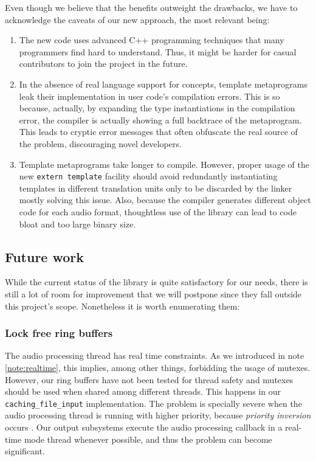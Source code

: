 Even though we believe that the benefits outweight the drawbacks, we
have to acknowledge the caveats of our new approach, the most relevant
being:
\begin{enumerate}
\item The new code uses advanced C++ programming techniques that many
  programmers find hard to understand. Thus, it might be harder for
  casual contributors to join the project in the future.

\item In the absence of real language support for concepts, template
  metaprograms leak their implementation in user code's compilation
  errors. This is so because, actually, by expanding the type
  instantiations in the compilation error, the compiler is actually
  showing a full backtrace of the metaprogram. This leads to cryptic
  error messages that often obfuscate the real source of the problem,
  discouraging novel developers.

\item Template metaprograms take longer to compile. However, proper
  usage of the new \texttt{extern template} facility should avoid
  redundantly instantiating templates in different translation units
  only to be discarded by the linker mostly solving this issue. Also,
  because the compiler generates different object code for each audio
  format, thoughtless use of the library can lead to code bloat and
  too large binary size.
\end{enumerate}

\subsection{Future work}

While the current status of the library is quite satisfactory for our
needs, there is still a lot of room for improvement that we will
postpone since they fall outside this project's scope. Nonetheless it
is worth enumerating them:

\subsubsection{Lock free ring buffers}
\label{sec:fixringbuffer}

The audio processing thread has real time
constraints. As we introduced in note \ref{note:realtime}, this
implies, among other things, forbidding the usage of mutexes. However,
our ring buffers have not been tested for thread safety and mutexes
should be used when shared among different threads. This happens in
our \texttt{caching\_file\_input} implementation. The problem is
specially severe when the audio processing thread is running with
higher priority, because \emph{priority
  inversion} occurs \cite{kim03basic}. Our output subsystems execute
the audio processing callback in a real-time mode thread whenever
possible, and thus the problem can become significant.

